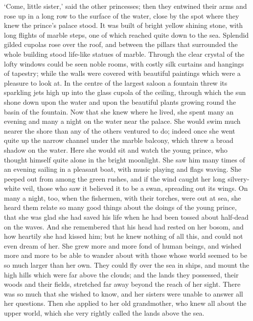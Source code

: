 `Come, little sister,' said the other princesses; then they entwined their arms and rose up in a long row to the surface of the water, close by the spot where they knew the prince’s palace stood.
It was built of bright yellow shining stone, with long flights of marble steps, one of which reached quite down to the sea.
Splendid gilded cupolas rose over the roof, and between the pillars that surrounded the whole building stood life-like statues of marble.
Through the clear crystal of the lofty windows could be seen noble rooms, with costly silk curtains and hangings of tapestry; while the walls were covered with beautiful paintings which were a pleasure to look at.
In the centre of the largest saloon a fountain threw its sparkling jets high up into the glass cupola of the ceiling, through which the sun shone down upon the water and upon the beautiful plants growing round the basin of the fountain.
Now that she knew where he lived, she spent many an evening and many a night on the water near the palace.
She would swim much nearer the shore than any of the others ventured to do; indeed once she went quite up the narrow channel under the marble balcony, which threw a broad shadow on the water.
Here she would sit and watch the young prince, who thought himself quite alone in the bright moonlight.
She saw him many times of an evening sailing in a pleasant boat, with music playing and flags waving.
She peeped out from among the green rushes, and if the wind caught her long silvery-white veil, those who saw it believed it to be a swan, spreading out its wings.
On many a night, too, when the fishermen, with their torches, were out at sea, she heard them relate so many good things about the doings of the young prince, that she was glad she had saved his life when he had been tossed about half-dead on the waves.
And she remembered that his head had rested on her bosom, and how heartily she had kissed him; but he knew nothing of all this, and could not even dream of her.
She grew more and more fond of human beings, and wished more and more to be able to wander about with those whose world seemed to be so much larger than her own.
They could fly over the sea in ships, and mount the high hills which were far above the clouds; and the lands they possessed, their woods and their fields, stretched far away beyond the reach of her sight.
There was so much that she wished to know, and her sisters were unable to answer all her questions.
Then she applied to her old grandmother, who knew all about the upper world, which she very rightly called the lands above the sea.

